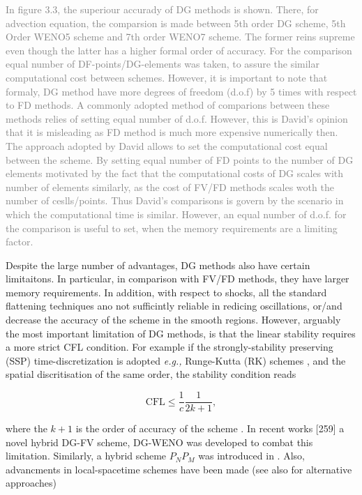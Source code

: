 \documentclass[11pt,a4paper,headinclude=true,DIV=14,BCOR=8mm,chapterprefix,listof=totoc,twoside,openright,abstracton]{scrbook}
\begin{document}
\textcolor{gray}{In figure 3.3, the superiour accurady of DG methods is shown. There, for advection equation, the comparsion is made between 5th order DG scheme, 5th Order WENO5 scheme and 7th order WENO7 scheme. The former reins supreme even though the latter has a higher formal order of accuracy. For the comparison equal number of DF-points/DG-elements was taken, to assure the similar computational cost between schemes. However, it is important to note that formaly, DG method have more degrees of freedom (d.o.f) by 5 times with respect to FD methods. A commonly adopted method of comparions between these methods relies of setting equal number of d.o.f. However, this is David's opinion that it is misleading as FD method is much more expensive numerically then. The approach adopted by David allows to set the computational cost equal between the scheme. By setting equal number of FD points to the number of DG elements motivated by the fact that the computational costs of DG scales with number of elements similarly, as the cost of FV/FD methods scales woth the number of ceslls/points. Thus David's comparisons is govern by the scenario in which the computational time is similar. However, an equal number of d.o.f. for the comparison is useful to set, when the memory requirements are a limiting factor.}

Despite the large number of advantages, DG methods also have certain limitaitons. In particular, in comparison with FV/FD methods, they have larger memory requirements. In addition, with respect to shocks, all the standard flattening techniques ano not sufficintly reliable in redicing oscillations, or/and decrease the accuracy of the scheme in the smooth regions. However, arguably the most important limitation of DG methods, is that the linear stability requires a more strict CFL condition. For example if the strongly-stability preserving (SSP) time-discretization is adopted \textit{e.g.,} Runge-Kutta (RK) schemes \cite{Gottlieb:2009}, and the spatial discritisation of the same order, the stability condition reads

\begin{equation}
    \text{CFL} \leq \frac{1}{c}\frac{1}{2k + 1},
\end{equation}

where the $k+1$ is the order of accuracy of the scheme \cite{Cockburn:2001}. In recent works [259]\cite{Qiu:2005,Qiu:2004} a novel hybrid DG-FV scheme, DG-WENO was developed to combat this limitation. Similarly, a hybrid scheme $P_N P_M$ was introduced in \cite{Dumbser:2009,Dumbser:2008}. Also, advancments in local-spacetime schemes have been made \cite{Gassner:2011} (see also \cite{Hesthaven:2007} for alternative approaches)
\end{document}
